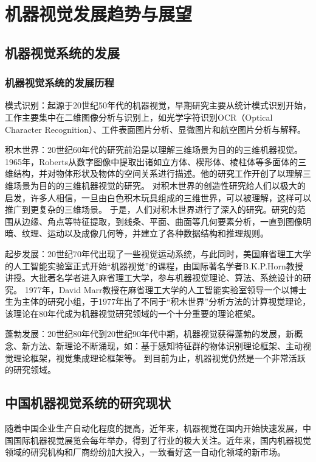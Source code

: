 {\chapter{机器视觉发展趋势与展望}


\section{机器视觉系统的发展}
\subsection{机器视觉系统的发展历程}
模式识别：起源于20世纪50年代的机器视觉，早期研究主要从统计模式识别开始，工作主要集中在二维图像分析与识别上，如光学字符识别OCR（Optical Character Recognition）、工件表面图片分析、显微图片和航空图片分析与解释。 
 
积木世界：20世纪60年代的研究前沿是以理解三维场景为目的的三维机器视觉。1965年，Roberts从数字图像中提取出诸如立方体、楔形体、棱柱体等多面体的三维结构，并对物体形状及物体的空间关系进行描述。他的研究工作开创了以理解三维场景为目的的三维机器视觉的研究。  
对积木世界的创造性研究给人们以极大的启发，许多人相信，一旦由白色积木玩具组成的三维世界，可以被理解，这样可以推广到更复杂的三维场景。  
于是，人们对积木世界进行了深入的研究。研究的范围从边缘、角点等特征提取，到线条、平面、曲面等几何要素分析，一直到图像明暗、纹理、运动以及成像几何等，并建立了各种数据结构和推理规则。  

起步发展：20世纪70年代出现了一些视觉运动系统，与此同时，美国麻省理工大学的人工智能实验室正式开始“机器视觉”的课程，由国际著名学者B.K.P.Horn教授讲授。大批著名学者进入麻省理工大学，参与机器视觉理论、算法、系统设计的研究。  
1977年，David Marr教授在麻省理工大学的人工智能实验室领导一个以博士生为主体的研究小组，于1977年出了不同于“积木世界”分析方法的计算视觉理论，该理论在80年代成为机器视觉研究领域的一个十分重要的理论框架。

蓬勃发展：20世纪80年代到20世纪90年代中期，机器视觉获得蓬勃的发展，新概念、新方法、新理论不断涌现，如：基于感知特征群的物体识别理论框架、主动视觉理论框架，视觉集成理论框架等。  
到目前为止，机器视觉仍然是一个非常活跃的研究领域。

\section{中国机器视觉系统的研究现状}
随着中国企业\citep{.2018g}生产自动化程度的提高，近年来，机器视觉在国内开始快速发展\citep{.2018e}，中国国际机器视觉展览会每年举办，得到了行业的极大关注。近年来\citep{.2018b}，国内机器视觉领域\citep{.2018h}的研究机构和厂商纷纷加大投入，一致看好这一自动化领域的新市场。
}
